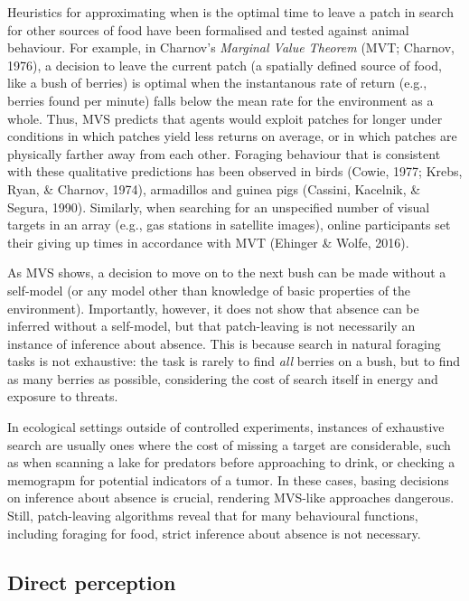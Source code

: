 \documentclass[12pt,twoside]{reedthesis}
\begin{document}
Heuristics for approximating when is the optimal time to leave a patch in search for other sources of food have been formalised and tested against animal behaviour. For example, in Charnov's \emph{Marginal Value Theorem} (MVT; Charnov, 1976), a decision to leave the current patch (a spatially defined source of food, like a bush of berries) is optimal when the instantanous rate of return (e.g., berries found per minute) falls below the mean rate for the environment as a whole. Thus, MVS predicts that agents would exploit patches for longer under conditions in which patches yield less returns on average, or in which patches are physically farther away from each other. Foraging behaviour that is consistent with these qualitative predictions has been observed in birds (Cowie, 1977; Krebs, Ryan, \& Charnov, 1974), armadillos and guinea pigs (Cassini, Kacelnik, \& Segura, 1990). Similarly, when searching for an unspecified number of visual targets in an array (e.g., gas stations in satellite images), online participants set their giving up times in accordance with MVT (Ehinger \& Wolfe, 2016).

As MVS shows, a decision to move on to the next bush can be made without a self-model (or any model other than knowledge of basic properties of the environment). Importantly, however, it does not show that absence can be inferred without a self-model, but that patch-leaving is not necessarily an instance of inference about absence. This is because search in natural foraging tasks is not exhaustive: the task is rarely to find \emph{all} berries on a bush, but to find as many berries as possible, considering the cost of search itself in energy and exposure to threats.

In ecological settings outside of controlled experiments, instances of exhaustive search are usually ones where the cost of missing a target are considerable, such as when scanning a lake for predators before approaching to drink, or checking a memograpm for potential indicators of a tumor. In these cases, basing decisions on inference about absence is crucial, rendering MVS-like approaches dangerous. Still, patch-leaving algorithms reveal that for many behavioural functions, including foraging for food, strict inference about absence is not necessary.

\hypertarget{absenceperception}{%
\subsection*{Direct perception}\label{absenceperception}}
\end{document}
